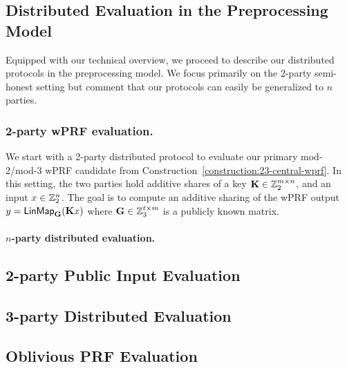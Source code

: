 \subsection{Distributed Evaluation in the Preprocessing Model}
Equipped with our technical overview, we proceed to describe our distributed protocols in the preprocessing model. We focus primarily on the 2-party semi-honest setting but comment that our protocols can easily be generalized to $n$ parties. 

\subsubsection{2-party wPRF evaluation.}
We start with a 2-party distributed protocol to evaluate our primary mod-2/mod-3 wPRF candidate from Construction~\ref{construction:23-central-wprf}. In this setting, the two parties hold additive shares of a key $\mat{K} \in \Z_2^{m \times n}$, and an input $x \in \mathbb{Z}_2^n$. The goal is to compute an additive sharing of the wPRF output $y = \LinMap_\mat{G}(\mat{K}x)$ where $\mat{G} \in \Z_3^{t \times m}$ is a publicly known matrix. 



\paragraph{$n$-party distributed evaluation.}

\subsection{2-party Public Input Evaluation}

\subsection{3-party Distributed Evaluation}

\subsection{Oblivious PRF Evaluation}
